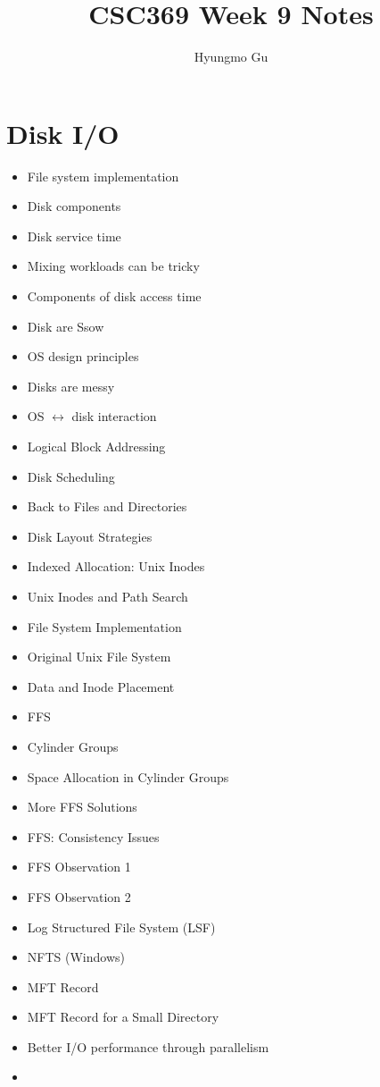 \documentclass[12pt]{article}
\begin{document}
\title{CSC369 Week 9 Notes}
\author{Hyungmo Gu}
\maketitle

\section{Disk I/O}

\begin{itemize}
    \item File system implementation
    \item Disk components
    \item Disk service time
    \item Mixing workloads can be tricky
    \item Components of disk access time
    \item Disk are Ssow
    \item OS design principles
    \item Disks are messy
    \item OS $\leftrightarrow$ disk interaction
    \item Logical Block Addressing
    \item Disk Scheduling
    \item Back to Files and Directories
    \item Disk Layout Strategies
    \item Indexed Allocation: Unix Inodes
    \item Unix Inodes and Path Search
    \item File System Implementation
    \item Original Unix File System
    \item Data and Inode Placement
    \item FFS
    \item Cylinder Groups
    \item Space Allocation in Cylinder Groups
    \item More FFS Solutions
    \item FFS: Consistency Issues
    \item FFS Observation 1
    \item FFS Observation 2
    \item Log Structured File System (LSF)
    \item NFTS (Windows)
    \item MFT Record
    \item MFT Record for a Small Directory
    \item Better I/O performance through parallelism
    \item
\end{itemize}
\end{document}
